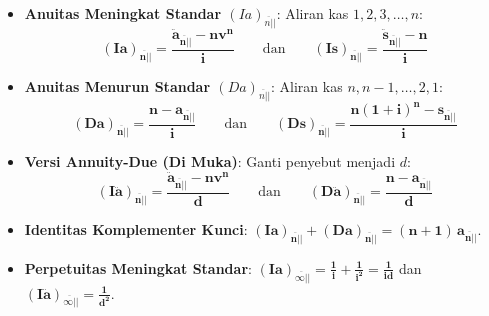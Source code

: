 \documentclass[10pt,a4paper]{article}
\newcommand{\angl}[1]{\overline{#1|}}
\newcommand{\ia}{(Ia)}
\newcommand{\da}{(Da)}
\newcommand{\is}{(Is)}
\newcommand{\ds}{(Ds)}
\newcommand{\iad}{(I\ddot{a})}
\newcommand{\dad}{(D\ddot{a})}
\begin{document}
\begin{teoremabox}
\begin{itemize}[leftmargin=1.5em, topsep=1.5pt, itemsep=2pt]
    \item \textbf{Anuitas Meningkat Standar $\ia_{\angl{n}|}$}: Aliran kas $1, 2, 3, \dots, n$:
    \begin{equation*}
        \mathbf{\ia_{\angl{n}|} = \frac{\ddot{a}_{\angl{n}|} - n v^n}{i}} \qquad\text{dan}\qquad \mathbf{\is_{\angl{n}|} = \frac{\ddot{s}_{\angl{n}|} - n}{i}}
    \end{equation*}
    \item \textbf{Anuitas Menurun Standar $\da_{\angl{n}|}$}: Aliran kas $n, n-1, \dots, 2, 1$:
    \begin{equation*}
        \mathbf{\da_{\angl{n}|} = \frac{n - a_{\angl{n}|}}{i}} \qquad\text{dan}\qquad \mathbf{\ds_{\angl{n}|} = \frac{n(1+i)^n - s_{\angl{n}|}}{i}}
    \end{equation*}
    \item \textbf{Versi Annuity-Due (Di Muka)}: Ganti penyebut menjadi $d$:
    \begin{equation*}
        \mathbf{\iad_{\angl{n}|} = \frac{\ddot{a}_{\angl{n}|} - n v^n}{d}} \qquad\text{dan}\qquad \mathbf{\dad_{\angl{n}|} = \frac{n - a_{\angl{n}|}}{d}}
    \end{equation*}
    \item \textbf{Identitas Komplementer Kunci}: $\mathbf{\ia_{\angl{n}|} + \da_{\angl{n}|} = (n+1) \, a_{\angl{n}|}}$.
    \item \textbf{Perpetuitas Meningkat Standar}: $\mathbf{\ia_{\angl{\infty}|} = \frac{1}{i} + \frac{1}{i^2} = \frac{1}{id}}$ \quad dan \quad $\mathbf{\iad_{\angl{\infty}|} = \frac{1}{d^2}}$.
\end{itemize}
\end{teoremabox}
\end{document}
